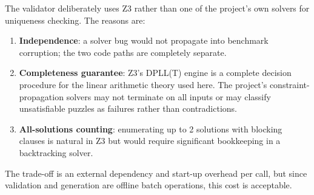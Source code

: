 The validator deliberately uses Z3 rather than one of the project's own
solvers for uniqueness checking.
The reasons are:

\begin{enumerate}
  \item \textbf{Independence}: a solver bug would not propagate into
        benchmark corruption; the two code paths are completely separate.
  \item \textbf{Completeness guarantee}: Z3's DPLL(T) engine is a complete
        decision procedure for the linear arithmetic theory used here.
        The project's constraint-propagation solvers may not terminate on
        all inputs or may classify unsatisfiable puzzles as failures rather
        than contradictions.
  \item \textbf{All-solutions counting}: enumerating up to 2 solutions with
        blocking clauses is natural in Z3 but would require significant
        bookkeeping in a backtracking solver.
\end{enumerate}

The trade-off is an external dependency and start-up overhead per call, but
since validation and generation are offline batch operations, this cost is
acceptable.
